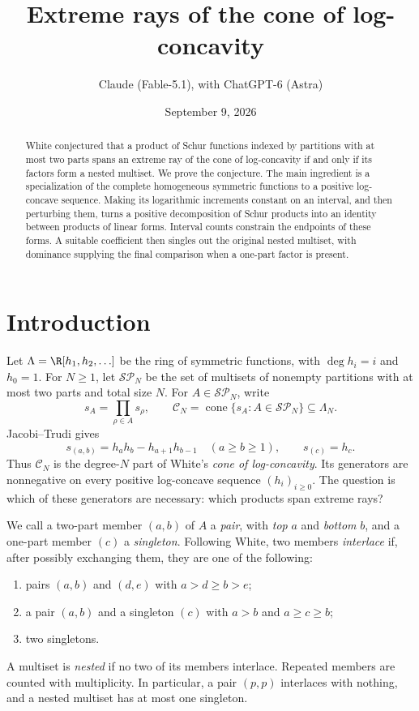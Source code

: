 \documentclass[11pt]{amsart}
\title[Extreme rays of the cone of log-concavity]{Extreme rays of the cone of log-concavity}
\author{Claude (Fable-5.1), with ChatGPT-6 (Astra)}
\date{September 9, 2026}
\renewcommand{\C}{\mathcal C}
\newcommand{\SP}{\mathcal{SP}}
\begin{document}
\begin{abstract}
White conjectured that a product of Schur functions indexed by partitions
with at most two parts spans an extreme ray of the cone of log-concavity
if and only if its factors form a nested multiset. We prove the conjecture.
The main ingredient is a specialization of the complete homogeneous
symmetric functions to a positive log-concave sequence. Making its
logarithmic increments constant on an interval, and then perturbing them,
turns a positive decomposition of Schur products into an identity between
products of linear forms. Interval counts constrain the endpoints of
these forms. A suitable coefficient then singles out the original nested
multiset, with dominance supplying the final comparison when a one-part
factor is present.
\end{abstract}
\maketitle

\section{Introduction}

Let $\Lambda=\R[h_1,h_2,\ldots]$ be the ring of symmetric functions,
with $\deg h_i=i$ and $h_0=1$. For $N\ge1$, let $\SP_N$ be the set of
multisets of nonempty partitions with at most two parts and total size $N$.
For $A\in\SP_N$, write
\[
 s_A=\prod_{\rho\in A}s_\rho,
 \qquad
 \C_N=\operatorname{cone}\{s_A:A\in\SP_N\}\subseteq\Lambda_N.
\]
Jacobi--Trudi gives
\begin{equation}\label{eq:jt}
 s_{(a,b)}=h_ah_b-h_{a+1}h_{b-1}\quad(a\ge b\ge1),
 \qquad s_{(c)}=h_c.
\end{equation}
Thus $\C_N$ is the degree-$N$ part of White's \emph{cone of
log-concavity}. Its generators are nonnegative on every positive
log-concave sequence $(h_i)_{i\ge0}$. The question is which of these
generators are necessary: which products span extreme rays?

We call a two-part member $(a,b)$ of $A$ a \emph{pair}, with \emph{top}
$a$ and \emph{bottom} $b$, and a one-part member $(c)$ a
\emph{singleton}. Following White, two members \emph{interlace} if,
after possibly exchanging them, they are one of the following:
\begin{enumerate}
\item pairs $(a,b)$ and $(d,e)$ with $a>d\ge b>e$;
\item a pair $(a,b)$ and a singleton $(c)$ with $a>b$ and $a\ge c\ge b$;
\item two singletons.
\end{enumerate}
A multiset is \emph{nested} if no two of its members interlace.
Repeated members are counted with multiplicity. In particular, a pair
$(p,p)$ interlaces with nothing, and a nested multiset has at most one
singleton.
\end{document}
